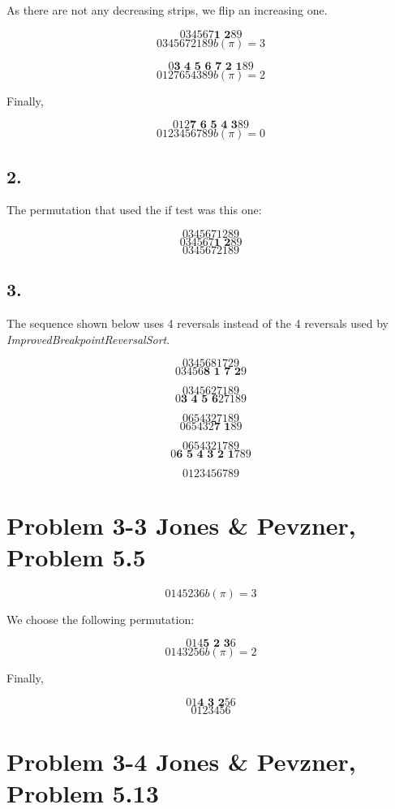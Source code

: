 \documentclass{article}
\begin{document}
As there are not any decreasing strips, we flip an increasing one.

$$0 3 4 5 6 7 \textbf{1 2} 8 9$$
$$0 3 4 5 6 7 2 1 8 9 b(\pi) = 3$$

$$0 \textbf{3 4 5 6 7 2 1} 8 9$$
$$0 1 2 7 6 5 4 3 8 9 b(\pi) = 2$$

Finally,

$$0 1 2 \textbf{7 6 5 4 3} 8 9$$
$$0 1 2 3 4 5 6 7 8 9 b(\pi) = 0$$

\subsection*{2.}

The permutation that used the if test was this one:

$$0 3 4 5 6 7 1 2 8 9$$
$$0 3 4 5 6 7 \textbf{1 2} 8 9$$
$$0 3 4 5 6 7 2 1 8 9$$

\subsection*{3.}

The sequence shown below uses 4 reversals instead of the 4 reversals used by \textit{ImprovedBreakpointReversalSort}.

$$0 3 4 5 6 8 1 7 2 9$$
$$0 3 4 5 6 \textbf{8 1 7 2} 9$$

$$0 3 4 5 6 2 7 1 8 9$$
$$0 \textbf{3 4 5 6} 2 7 1 8 9$$

$$0 6 5 4 3 2 7 1 8 9$$
$$0 6 5 4 3 2 \textbf{7 1} 8 9$$

$$0 6 5 4 3 2 1 7 8 9$$
$$0 \textbf{6 5 4 3 2 1} 7 8 9$$

$$0 1 2 3 4 5 6 7 8 9$$

\section*{Problem 3-3 Jones \& Pevzner, Problem 5.5}

$$0 1 4 5 2 3 6 b(\pi) = 3$$

We choose the following permutation:

$$0 1 4 \textbf{5 2 3} 6$$
$$0 1 4 3 2 5 6 b(\pi) = 2$$

Finally,

$$0 1 \textbf{4 3 2} 5 6$$
$$0 1 2 3 4 5 6$$


\section*{Problem 3-4 Jones \& Pevzner, Problem 5.13}
\end{document}
